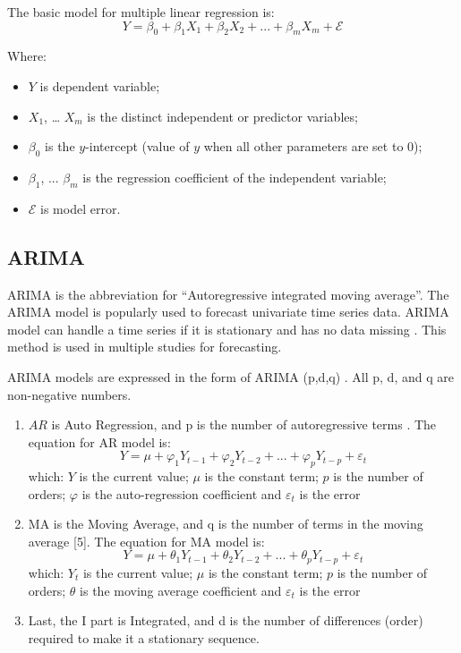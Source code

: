\documentclass{ieeeojies}
\begin{document}
The basic model for multiple linear regression is:
\begin{equation}
    Y = \beta_0 + \beta_1X_1 + \beta_2X_2 + ... + \beta_mX_m + \mathcal{E}
\end{equation}

Where: 
\begin{itemize}
    \item $Y$ is dependent variable;
    \item $X_1$, … $X_m$ is the distinct independent or predictor variables;
    \item $\beta_0$ is the $y$-intercept (value of $y$ when all other parameters are set to 0);
    \item $\beta_1$, ... $\beta_m$ is the regression coefficient of the independent variable;
    \item $\mathcal{E}$ is model error.
\end{itemize}
       

\subsection{ARIMA}
ARIMA is the abbreviation for “Autoregressive integrated moving average”. The ARIMA model is popularly used to forecast univariate time series data. ARIMA model can handle a time series if it is stationary and has no data missing \cite{b6}. This method is used in multiple studies for forecasting.

ARIMA models are expressed in the form of ARIMA (p,d,q) \cite{b7}. All p, d, and q are non-negative numbers.

\begin{enumerate}
    \item$AR$ is Auto Regression, and p is the number of autoregressive terms \cite{b8}. The equation for AR model is:
          \begin{equation}
              Y = \mu + \varphi_1Y_{t-1} + \varphi_2Y_{t-2} + ... + \varphi_pY_{t-p} + \varepsilon_t
          \end{equation}
          which: $Y$ is the current value; $\mu$ is the constant term; $p$ is the number of orders; $\varphi$ is the auto-regression coefficient and $\varepsilon_t$ is the error
    \item MA is the Moving Average, and q is the number of terms in the moving average [5]. The equation for MA model is:
          \begin{equation}
              Y = \mu + \theta_1Y_{t-1} + \theta_2Y_{t-2} + ... + \theta_pY_{t-p} + \varepsilon_t
          \end{equation}
          which: $Y_t$ is the current value; $\mu$ is the constant term; $p$ is the number of orders; $\theta$ is the moving average coefficient and $\varepsilon_t$ is the error
    \item Last, the I part is Integrated, and d is the number of differences (order) required to make it a stationary sequence.
\end{enumerate}
\end{document}
